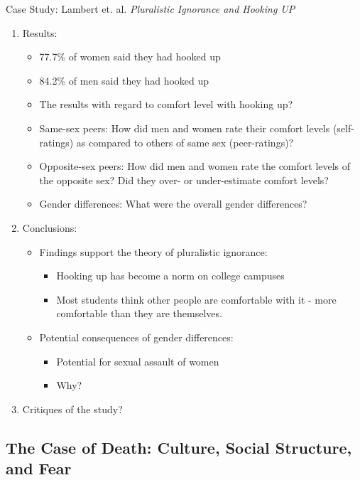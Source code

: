 \documentclass[12pt,a4paper]{article}
\begin{document}
\begin{enumerate}
\begin{enumerate}
\begin{eg}{Case Study: Lambert et. al. \textit{Pluralistic Ignorance and Hooking UP}}
\begin{enumerate}
				\item Results: 
				\begin{itemize}
					\item 77.7\% of women said they had hooked up
					\item 84.2\% of men said they had hooked up
					\item The results with regard to comfort level with hooking up? 
					\item Same-sex peers: How did men and women rate their comfort levels (self-ratings) as compared to others of same sex (peer-ratings)?
					\item Opposite-sex peers: How did men and women rate the comfort levels of the opposite sex? Did they over- or under-estimate comfort levels? 
					\item Gender differences: What were the overall gender differences? 
				\end{itemize}
				\item Conclusions: 
				\begin{itemize}
					\item Findings support the theory of pluralistic ignorance:
					\begin{itemize}
						\item Hooking up has become a norm on college campuses
						\item Most students think other people are comfortable with it - more comfortable than they are themselves. 
					\end{itemize}
					\item Potential consequences of gender differences: 
					\begin{itemize}
						\item Potential for sexual assault of women
						\item Why? 
					\end{itemize}
				\end{itemize}
				\item Critiques of the study? 
			\end{enumerate}	
		\end{eg}

	\end{enumerate}	
\end{enumerate}





\subsection{The Case of Death: Culture, Social Structure, and Fear}
\end{document}
